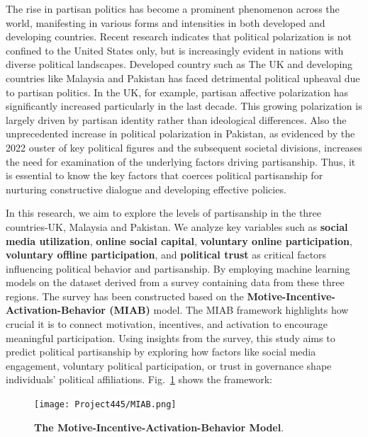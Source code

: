 \documentclass[pt]{article}  %
\begin{document}
The rise in partisan politics has become a prominent phenomenon across the world, manifesting in various forms and intensities in both developed and developing countries. Recent research indicates that political polarization is not confined to the United States only, but is increasingly evident in nations with diverse political landscapes\cite{ref1}. Developed country such as The UK and developing countries like Malaysia and Pakistan has faced detrimental political upheaval due to partisan politics. In the UK, for example, partisan affective polarization has significantly increased particularly in the last decade. This growing polarization is largely driven by partisan identity rather than ideological differences\cite{ref2}. Also the unprecedented increase in political polarization in Pakistan, as evidenced by the 2022 ouster of key political figures and the subsequent societal divisions\cite{ref3}, increases the need for examination of the underlying factors driving partisanship. Thus, it is essential to know the key factors that coerces political partisanship for nurturing constructive dialogue and developing effective policies.

In this research, we aim to explore the levels of partisanship in the three countries-UK, Malaysia and Pakistan. We analyze key variables such as \textbf{social media utilization}, \textbf{online social capital}, \textbf{voluntary online participation}, \textbf{voluntary offline participation}, and \textbf{political trust} as critical factors influencing political behavior and partisanship. By employing machine learning models on the dataset derived from a survey containing data from these three regions. The survey has been constructed based on the \textbf{Motive-Incentive-Activation-Behavior (MIAB)} model\cite{ref4}. The MIAB framework highlights how crucial it is to connect motivation, incentives, and activation to encourage meaningful participation. Using insights from the survey, this study aims to predict political partisanship by exploring how factors like social media engagement, voluntary political participation, or trust in governance shape individuals’ political affiliations. Fig.~\ref{fig:figure1} shows the framework:\vspace{0.5cm}

\begin{figure}[h]
    \centering
    \texttt{[image: Project445/MIAB.png]} %
    \caption{\textbf{The Motive-Incentive-Activation-Behavior Model}\cite{ref5}.}
    \label{fig:figure1}
\end{figure}
\end{document}
